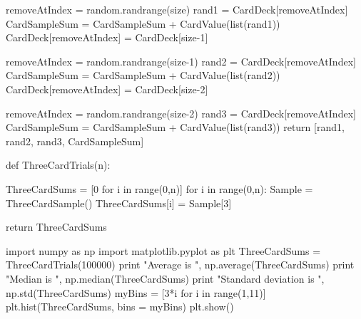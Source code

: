 \documentclass[12pt]{amsart}
\begin{document}
\begin{python}
    removeAtIndex = random.randrange(size)
    rand1 = CardDeck[removeAtIndex]
    CardSampleSum = CardSampleSum + CardValue(list(rand1))
    CardDeck[removeAtIndex] = CardDeck[size-1]
    
    removeAtIndex = random.randrange(size-1)
    rand2 = CardDeck[removeAtIndex]
    CardSampleSum = CardSampleSum + CardValue(list(rand2))
    CardDeck[removeAtIndex] = CardDeck[size-2]
    
    removeAtIndex = random.randrange(size-2)
    rand3 = CardDeck[removeAtIndex]
    CardSampleSum = CardSampleSum + CardValue(list(rand3))
    return [rand1, rand2, rand3, CardSampleSum]


def ThreeCardTrials(n):
    
    ThreeCardSums = [0 for i in range(0,n)]
    for i in range(0,n):
        Sample = ThreeCardSample()
        ThreeCardSums[i] = Sample[3]
    
    return ThreeCardSums
    
import numpy as np
import matplotlib.pyplot as plt
ThreeCardSums = ThreeCardTrials(100000)
print "Average is ", np.average(ThreeCardSums) 
print "Median is ", np.median(ThreeCardSums)
print "Standard deviation is ", np.std(ThreeCardSums)
myBins = [3*i for i in range(1,11)]
plt.hist(ThreeCardSums, bins = myBins)
plt.show()
\end{python}
\end{document}
